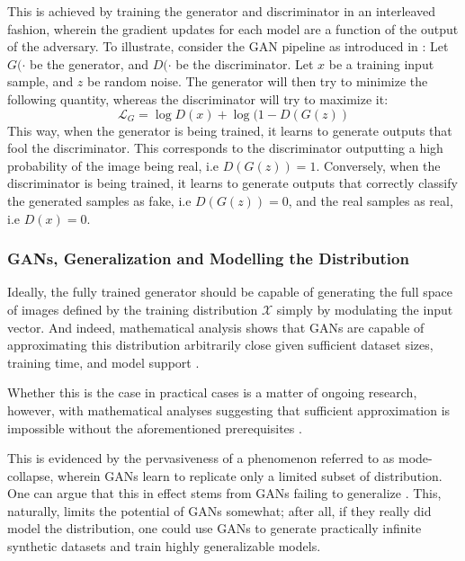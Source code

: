      This is achieved by training the generator and discriminator in an interleaved fashion, wherein the gradient updates for each model are a function of the output of the adversary. To illustrate, consider the GAN pipeline as introduced in \cite{gan_first}:
     Let \(G(\cdot\) be the generator, and \(D(\cdot\) be the discriminator. Let \(x\) be a training input sample, and \(z\) be random noise. The generator will then try to minimize the following quantity, whereas the discriminator will try to maximize it:
     \begin{equation}\label{gan_loss}
        \mathcal{L}_G = \log{D(x)} + \log{(1-D(G(z))} 
     \end{equation}
     This way, when the generator is being trained, it learns to generate outputs that fool the discriminator. This corresponds to the discriminator outputting a high probability of the image being real, i.e \(D(G(z)) = 1\). Conversely, when the discriminator is being trained, it learns to generate outputs that correctly classify the generated samples as fake, i.e \(D(G(z)) = 0\), and the real samples as real, i.e \(D(x) = 0\). 
     
     \subsubsection{GANs, Generalization and Modelling the Distribution}
     Ideally, the fully trained generator should be capable of generating the full space of images defined by the training distribution \(\mathcal{X}\) simply by modulating the input vector. And indeed, mathematical analysis shows that GANs are capable of approximating this distribution arbitrarily close given sufficient dataset sizes, training time, and model support \cite{gan_first}. 
     
     Whether this is the case in practical cases is a matter of ongoing research, however, with mathematical analyses suggesting that sufficient approximation is impossible without the aforementioned prerequisites \cite{gan_learning_distribution}.
     
     This is evidenced by the pervasiveness of a phenomenon referred to as mode-collapse, wherein GANs learn to replicate only a limited subset of distribution. One can argue that this in effect stems from GANs failing to generalize \cite{gan_gen}. This, naturally, limits the potential of GANs somewhat; after all, if they really did model the distribution, one could use GANs to generate practically infinite synthetic datasets and train highly generalizable models. 
     

